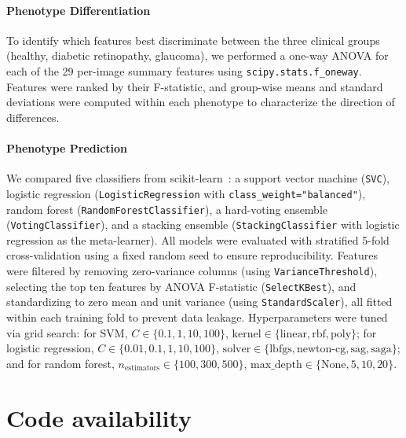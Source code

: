 \documentclass[11pt]{article}
\begin{document}
\paragraph{Phenotype Differentiation}\label{sec:methods:setup:phenodiff}

To identify which features best discriminate between the three
clinical groups (healthy, diabetic retinopathy, glaucoma), we
performed a one-way ANOVA for each of the 29 per-image summary
features using \texttt{scipy.stats.f\_oneway}. Features were ranked
by their F-statistic, and group-wise means and standard deviations
were computed within each phenotype to characterize the direction of
differences.

\paragraph{Phenotype Prediction}\label{sec:methods:setup:phenoclass}

We compared five classifiers from scikit-learn~\cite{sklearn}: a
support vector machine (\texttt{SVC}), logistic regression
(\texttt{LogisticRegression} with \texttt{class\_weight="balanced"}),
random forest (\texttt{RandomForestClassifier}), a hard-voting
ensemble (\texttt{VotingClassifier}), and a stacking ensemble
(\texttt{StackingClassifier} with logistic regression as the
meta-learner). All models were evaluated with stratified 5-fold
cross-validation using a fixed random seed to ensure reproducibility.
Features were filtered by removing zero-variance columns (using
\texttt{VarianceThreshold}), selecting the top ten features by ANOVA
F-statistic (\texttt{SelectKBest}), and standardizing to zero mean
and unit variance (using \texttt{StandardScaler}), all fitted within
each training fold to prevent data leakage. Hyperparameters were
tuned via grid search: for SVM, $C \in \{0.1, 1, 10, 100\}$,
$\text{kernel} \in \{\text{linear}, \text{rbf}, \text{poly}\}$; for
logistic regression, $C \in \{0.01, 0.1, 1, 10, 100\}$,
$\text{solver} \in \{\text{lbfgs}, \text{newton-cg}, \text{sag},
\text{saga}\}$; and for random forest, $n_{\text{estimators}} \in
\{100, 300, 500\}$, $\text{max\_depth} \in \{\text{None}, 5, 10, 20\}$.

\section{Code availability}\label{sec:code}

\end{document}
